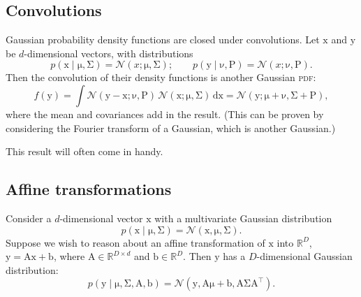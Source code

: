 \documentclass{article}
\newcommand{\acro}[1]{\textsc{\MakeLowercase{#1}}}
\newcommand{\given}{\mid}
\newcommand{\mc}[1]{\mathcal{#1}}
\newcommand{\intd}[1]{\,\mathrm{d}{#1}}
\newcommand{\trans}{^\top}
\newcommand{\mat}[1]{\bm{\mathrm{#1}}}
\renewcommand{\vec}[1]{\bm{\mathrm{#1}}}
\newcommand{\R}{\mathbb{R}}
\begin{document}
\subsection*{Convolutions}

Gaussian probability density functions are closed under convolutions.
Let $\vec{x}$ and $\vec{y}$ be $d$-dimensional vectors, with
distributions
\begin{equation*}
  p(\vec{x} \given \vec{\mu}, \mat{\Sigma})
  =
  \mc{N}(x; \vec{\mu}, \mat{\Sigma});
  \qquad
  p(\vec{y} \given \vec{\nu}, \mat{P})
  =
  \mc{N}(x; \vec{\nu}, \mat{P}).
\end{equation*}
Then the convolution of their density functions is another Gaussian
\acro{PDF}:
\begin{equation*}
  f(\vec{y}) =
  \int
  \mc{N}(\vec{y} - \vec{x}; \vec{\nu}, \mat{P})
  \,
  \mc{N}(\vec{x}; \vec{\mu}, \mat{\Sigma})
  \intd{\vec{x}}
  =
  \mc{N}(\vec{y}; \vec{\mu} + \vec{\nu}, \mat{\Sigma} + \mat{P}),
\end{equation*}
where the mean and covariances add in the result.  (This can be proven
by considering the Fourier transform of a Gaussian, which is another
Gaussian.)

This result will often come in handy.

\subsection*{Affine transformations}

Consider a $d$-dimensional vector $\vec{x}$ with a multivariate
Gaussian distribution
\begin{equation*}
  p(\vec{x} \given \vec{\mu}, \mat{\Sigma})
  =
  \mc{N}(\vec{x}, \vec{\mu}, \mat{\Sigma}).
\end{equation*}
Suppose we wish to reason about an affine transformation of $\vec{x}$
into $\R^D$, $\vec{y} = \mat{A}\vec{x} + \vec{b}$, where $\mat{A} \in
\R^{D \times d}$ and $\vec{b} \in \R^D$.  Then $\vec{y}$ has a
$D$-dimensional Gaussian distribution:
\begin{equation*}
  p(\vec{y} \given \vec{\mu}, \mat{\Sigma}, \mat{A}, \vec{b})
  =
  \mc{N}(\vec{y}, \mat{A}\vec{\mu} + \vec{b}, \mat{A}\mat{\Sigma}\mat{A}\trans).
\end{equation*}
\end{document}

